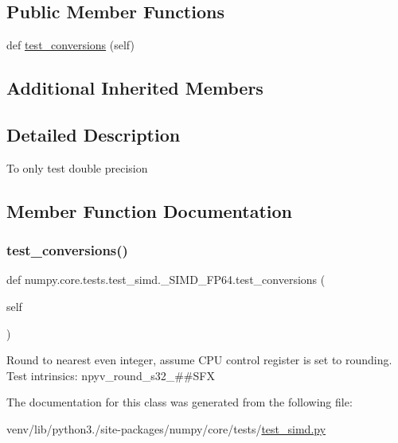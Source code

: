 \subsection*{Public Member Functions}
\begin{DoxyCompactItemize}
\item 
def \hyperlink{classnumpy_1_1core_1_1tests_1_1test__simd_1_1__SIMD__FP64_a8212d002a28d5c4b02d5f3e4f03e42ef}{test\+\_\+conversions} (self)
\end{DoxyCompactItemize}
\subsection*{Additional Inherited Members}


\subsection{Detailed Description}
\begin{DoxyVerb}To only test double precision
\end{DoxyVerb}
 

\subsection{Member Function Documentation}
\mbox{\label{classnumpy_1_1core_1_1tests_1_1test__simd_1_1__SIMD__FP64_a8212d002a28d5c4b02d5f3e4f03e42ef}} 
\subsubsection{\texorpdfstring{test\+\_\+conversions()}{test\_conversions()}}
{\footnotesize\ttfamily def numpy.\+core.\+tests.\+test\+\_\+simd.\+\_\+\+S\+I\+M\+D\+\_\+\+F\+P64.\+test\+\_\+conversions (\begin{DoxyParamCaption}\item[{}]{self }\end{DoxyParamCaption})}

\begin{DoxyVerb}Round to nearest even integer, assume CPU control register is set to rounding.
Test intrinsics:
    npyv_round_s32_##SFX
\end{DoxyVerb}
 

The documentation for this class was generated from the following file\+:\begin{DoxyCompactItemize}
\item 
venv/lib/python3./site-\/packages/numpy/core/tests/\hyperlink{test__simd_8py}{test\+\_\+simd.\+py}\end{DoxyCompactItemize}

